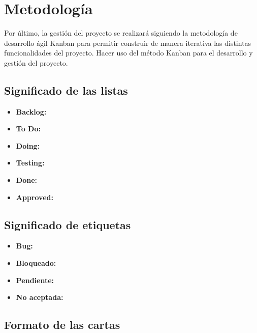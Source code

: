 \section{Metodología}
Por último, la gestión del proyecto se realizará siguiendo la metodología de desarrollo ágil Kanban para permitir construir de manera iterativa las distintas funcionalidades del proyecto.
Hacer uso del método Kanban para el desarrollo y gestión del proyecto.

\subsection{Significado de las listas}
\begin{itemize}
    \item \textbf{Backlog:}
    \item \textbf{To Do:}
    \item \textbf{Doing:}
    \item \textbf{Testing:}
    \item \textbf{Done:}
    \item \textbf{Approved:}
\end{itemize}

\subsection{Significado de etiquetas}
\begin{itemize}
    \item \textbf{Bug:}
    \item \textbf{Bloqueado:}
    \item \textbf{Pendiente:}
    \item \textbf{No aceptada:}
\end{itemize}

\subsection{Formato de las cartas}
